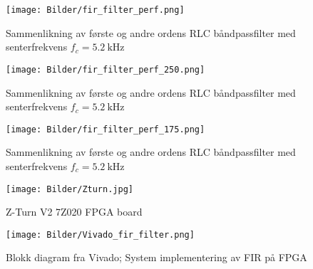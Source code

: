 \begin{figure}[H]
    \centering 
    \texttt{[image: Bilder/fir\_filter\_perf.png]}
    \caption{Sammenlikning av første og andre ordens RLC båndpassfilter med senterfrekvens $f_c = \SI{5.2}{\kilo\hertz}$}
    \label{fig:test_fir_filter_perf}
\end{figure}

\begin{figure}[H]
    \centering 
    \texttt{[image: Bilder/fir\_filter\_perf\_250.png]}
    \caption{Sammenlikning av første og andre ordens RLC båndpassfilter med senterfrekvens $f_c = \SI{5.2}{\kilo\hertz}$}
    \label{fig:test_fir_filter_perf_250}
\end{figure}

\begin{figure}[H]
    \centering 
    \texttt{[image: Bilder/fir\_filter\_perf\_175.png]}
    \caption{Sammenlikning av første og andre ordens RLC båndpassfilter med senterfrekvens $f_c = \SI{5.2}{\kilo\hertz}$}
    \label{fig:test_fir_filter_perf_175}
\end{figure}

\begin{figure}[H]
    \centering 
    \texttt{[image: Bilder/Zturn.jpg]}
    \caption{Z-Turn V2 7Z020 FPGA board \cite{zturn}}
    \label{fig:zturn}
\end{figure}

\begin{figure}[H]
    \centering 
    \texttt{[image: Bilder/Vivado\_fir\_filter.png]}
    \caption{Blokk diagram fra Vivado; System implementering av FIR på FPGA}
    \label{fig:vivado_fir_block_diagram}
\end{figure}
